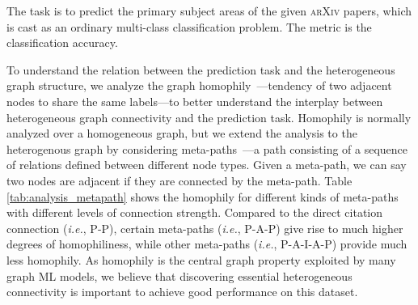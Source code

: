 \documentclass{article}
\newcommand{\ie}{\textit{i.e.}}
\begin{document}
{
The task is to predict the primary subject areas of the given \textsc{arXiv} papers, which is cast as an ordinary multi-class classification problem. The metric is the classification accuracy.

To understand the relation between the prediction task and the heterogeneous graph structure, we analyze the graph homophily~\citep{mcpherson2001birds}---tendency of two adjacent nodes to share the same labels---to better understand the interplay between heterogeneous graph connectivity and the prediction task.
Homophily is normally analyzed over a homogeneous graph, but we extend the analysis to the heterogenous graph by considering meta-paths~\citep{sun2011pathsim}---a path consisting of a sequence of relations defined between different node types.
Given a meta-path, we can say two nodes are adjacent if they are connected by the meta-path.
Table \ref{tab:analysis_metapath} shows the homophily for different kinds of meta-paths with different levels of connection strength.
Compared to the direct citation connection (\ie, P-P), certain meta-paths (\ie, P-A-P) give rise to much higher degrees of homophiliness, while other meta-paths (\ie, P-A-I-A-P) provide much less homophily.
As homophily is the central graph property exploited by many graph ML models, we believe that discovering essential heterogeneous connectivity is important to achieve good performance on this dataset.

}
\end{document}
